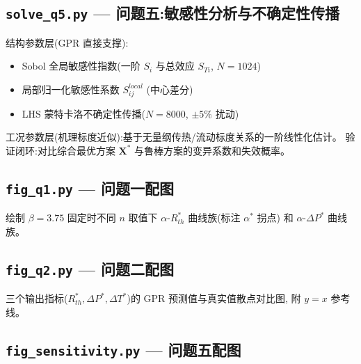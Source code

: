 

\newpage
\subsection{\texttt{solve\_q5.py} — 问题五:敏感性分析与不确定性传播}

结构参数层(GPR 直接支撑):
\begin{itemize}
    \item Sobol 全局敏感性指数(一阶 $S_i$ 与总效应 $S_{Ti}$, $N=1024$)
    \item 局部归一化敏感性系数 $S_{ij}^{local}$ (中心差分)
    \item LHS 蒙特卡洛不确定性传播($N=8000$, $\pm5\%$ 扰动)
\end{itemize}
工况参数层(机理标度近似):基于无量纲传热/流动标度关系的一阶线性化估计。
验证闭环:对比综合最优方案 $\mathbf{X}^*$ 与鲁棒方案的变异系数和失效概率。



\newpage
\subsection{\texttt{fig\_q1.py} — 问题一配图}

绘制 $\beta=3.75$ 固定时不同 $n$ 取值下 $\alpha$-$R_{th}^*$ 曲线族(标注 $\alpha^*$ 拐点)
和 $\alpha$-$\Delta P^*$ 曲线族。



\subsection{\texttt{fig\_q2.py} — 问题二配图}

三个输出指标($R_{th}^*,\Delta P^*,\Delta T^*$)的 GPR 预测值与真实值散点对比图,
附 $y=x$ 参考线。



\newpage
\subsection{\texttt{fig\_sensitivity.py} — 问题五配图}

